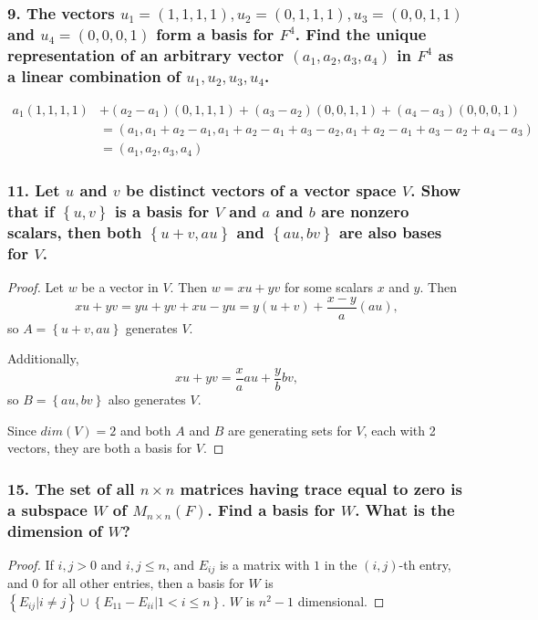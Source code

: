 \documentclass{article}
\begin{document}
\subsubsection*{9. The vectors $u_1 = (1,1,1,1), u_2=(0,1,1,1), u_3=(0,0,1,1)$ and $u_4 = (0,0,0,1)$ form a basis for $F^4$. Find the unique representation of an arbitrary vector $(a_1, a_2, a_3, a_4)$ in $F^4$ as a linear combination of $u_1, u_2, u_3, u_4$.}

\begin{align*}
	a_1(1,1,1,1) &+ (a_2 - a_1)(0, 1, 1, 1) + (a_3 - a_2)(0, 0, 1, 1) + (a_4 - a_3)(0, 0, 0, 1) \\&= (a_1, a_1 + a_2 - a_1, a_1 + a_2 - a_1 + a_3 - a_2, a_1 + a_2 - a_1 + a_3 - a_2 + a_4 - a_3) \\&= (a_1, a_2, a_3, a_4) 
\end{align*}

\subsubsection*{11. Let $u$ and $v$ be distinct vectors of a vector space $V$. Show that if $\left\{u, v\right\}$ is a basis for $V$ and $a$ and $b$ are nonzero scalars, then both $\left\{u + v, au\right\}$ and $\left\{au, bv\right\}$ are also bases for $V$.}

\begin{proof}
	Let $w$ be a vector in $V$. Then $w = xu + yv$ for some scalars $x$ and $y$. Then \[xu + yv = yu + yv + xu - yu = y(u + v) + \frac{x - y}{a}(au),\] so $A = \left\{u + v, au\right\}$ generates $V$.

	Additionally, \[xu + yv = \frac{x}{a}au + \frac{y}{b}bv,\] so $B = \left\{au, bv\right\}$ also generates $V$.
	
	Since $dim(V) = 2$ and both $A$ and $B$ are generating sets for $V$, each with 2 vectors, they are both a basis for $V$.
\end{proof}

\subsubsection*{15. The set of all $n\times n$ matrices having trace equal to zero is a subspace $W$ of $M_{n\times n}(F)$. Find a basis for $W$. What is the dimension of $W$?}

\begin{proof}
	If $i, j > 0$ and $i, j \le n$, and $E_{ij}$ is a matrix with $1$ in the $(i, j)$-th entry, and $0$ for all other entries, then a basis for $W$ is $\left\{E_{ij} | i \ne j\right\}\cup \left\{E_{11} - E_{ii} | 1 < i \le n \right\}$. $W$ is $n^2 - 1$ dimensional.
\end{proof}
\end{document}
